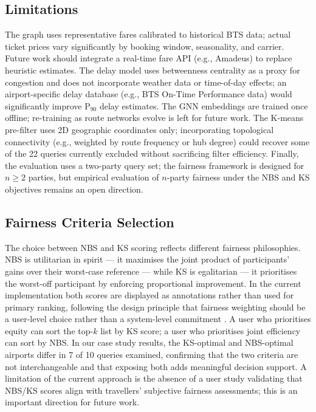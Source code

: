 \documentclass[review]{elsarticle}
\begin{document}
\subsection{Limitations}

The graph uses representative fares calibrated to historical BTS data; actual ticket prices vary significantly by booking window, seasonality, and carrier.
Future work should integrate a real-time fare API (e.g., Amadeus) to replace heuristic estimates.
The delay model uses betweenness centrality as a proxy for congestion and does not incorporate weather data or time-of-day effects; an airport-specific delay database (e.g., BTS On-Time Performance data) would significantly improve P$_{90}$ delay estimates.
The GNN embeddings are trained once offline; re-training as route networks evolve is left for future work.
The K-means pre-filter uses 2D geographic coordinates only; incorporating topological connectivity (e.g., weighted by route frequency or hub degree) could recover some of the 22 queries currently excluded without sacrificing filter efficiency.
Finally, the evaluation uses a two-party query set; the fairness framework is designed for $n \geq 2$ parties, but empirical evaluation of $n$-party fairness under the NBS and KS objectives remains an open direction.

\subsection{Fairness Criteria Selection}

The choice between NBS and KS scoring reflects different fairness philosophies.
NBS is utilitarian in spirit — it maximises the joint product of participants' gains over their worst-case reference — while KS is egalitarian — it prioritises the worst-off participant by enforcing proportional improvement.
In the current implementation both scores are displayed as annotations rather than used for primary ranking, following the design principle that fairness weighting should be a user-level choice rather than a system-level commitment \cite{rawls1971}.
A user who prioritises equity can sort the top-$k$ list by KS score; a user who prioritises joint efficiency can sort by NBS.
In our case study results, the KS-optimal and NBS-optimal airports differ in 7 of 10 queries examined, confirming that the two criteria are not interchangeable and that exposing both adds meaningful decision support.
A limitation of the current approach is the absence of a user study validating that NBS/KS scores align with travellers' subjective fairness assessments; this is an important direction for future work.
\end{document}
